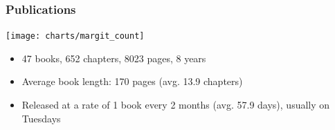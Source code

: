 \begin{frame}
    \frametitle{Publications}
    \texttt{[image: charts/margit\_count]}
    \vspace{-24pt}
    \begin{itemize}
        \item 47 books, 652 chapters, 8023 pages, 8 years
        \item Average book length: 170 pages (avg. 13.9 chapters)
        \item Released at a rate of 1 book every 2 months (avg. 57.9 days), usually on Tuesdays
    \end{itemize}
\end{frame}
